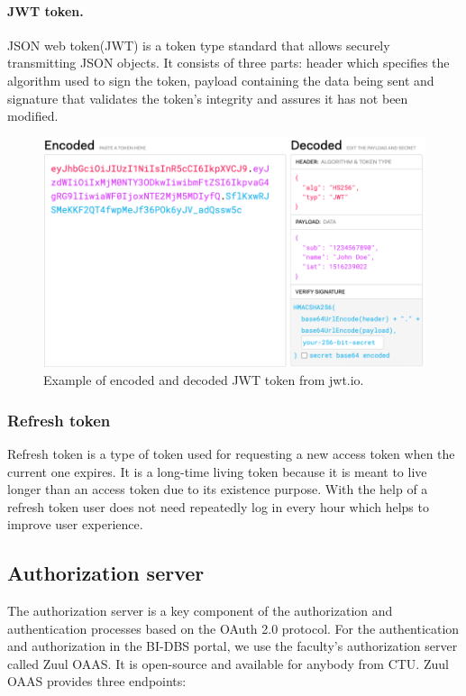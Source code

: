 \paragraph*{JWT token.} JSON web token(JWT) is a token type standard that allows securely transmitting JSON objects. It consists of three parts: header which specifies the algorithm used to sign the token, payload containing the data being sent and signature that validates the token's integrity and assures it has not been modified. \cite{jwt-token}

\begin{figure}[hp]
\centering
\includegraphics[scale=0.38]{../png/jwt_token.png}
\caption{Example of encoded and decoded JWT token from jwt.io. \cite{jwt-token}}
\label{jwt}
\end{figure}



\subsubsection{Refresh token} Refresh token is a type of token used for requesting a new access token when the current one expires. It is a long-time living token because it is meant to live longer than an access token due to its existence purpose. With the help of a refresh token user does not need repeatedly log in every hour which helps to improve user experience. \cite{refresh-token}


\subsection{Authorization server} The authorization server is a key component of the authorization and authentication processes based on the OAuth 2.0 protocol. 
For the authentication and authorization in the BI-DBS portal, we use the faculty's authorization server called Zuul OAAS. It is open-source and available for anybody from CTU. \cite{auth-server} Zuul OAAS provides three endpoints:

